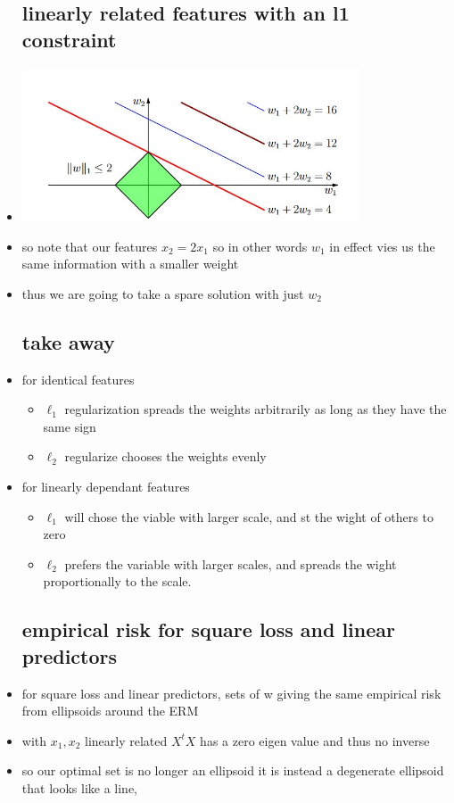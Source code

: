 \documentclass{article}
\begin{document}
\begin{itemize}
\subsection{linearly related features with an l1 constraint}
\item \includegraphics[width=10cm]{labs/lab_3/images/r3_4.jpg}
\item so note that our features $x_2=2x_1$ so in other words $w_1$ in effect vies us the same information with a smaller weight 
\item thus we are going to take a spare solution with just $w_2$

\subsection{take away}
\item for identical features
\begin{itemize}
    \item $\ell_{1}$ regularization spreads the weights arbitrarily as long as they have the same sign 
    \item $\ell_{2}$ regularize chooses the weights evenly
\end{itemize}
\item for linearly dependant features
\begin{itemize}
    \item $\ell_{1}$ will chose the viable with larger scale, and st the wight of others to zero
    \item $\ell_{2}$ prefers the variable with larger scales, and spreads the wight proportionally to the scale. 
\end{itemize}
\subsection{empirical risk for square loss and linear predictors}
\item for square loss and linear predictors, sets of w giving the same empirical risk from ellipsoids around the ERM
\item with $x_1, x_2$ linearly related $X^{t}X$ has a zero eigen value and thus no inverse 
\item so our optimal set is no longer an ellipsoid it is instead a degenerate ellipsoid that looks like a line, 
\end{itemize}
\end{document}
